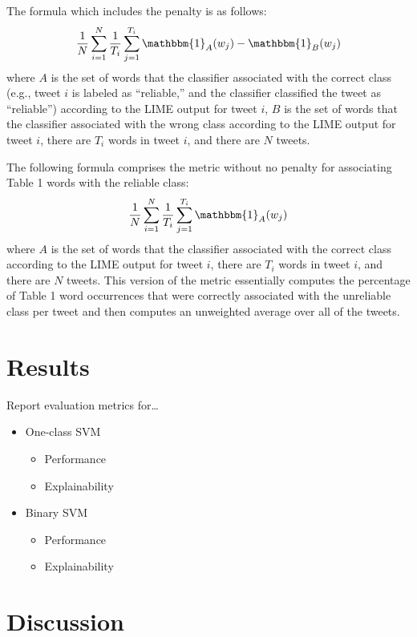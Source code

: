 \documentclass{article}
\begin{document}
The formula which includes the penalty is as follows:
\[\frac{1}{N} \sum_{i=1}^{N} \frac{1}{T_i} \sum_{j=1}^{T_i} \mathbbm{1}_A(w_j) - \mathbbm{1}_B(w_j)\]
where \(A\) is the set of words that the classifier associated with the
correct class (e.g., tweet \(i\) is labeled as ``reliable,'' and the
classifier classified the tweet as ``reliable'') according to the LIME
output for tweet \(i\), \(B\) is the set of words that the classifier
associated with the wrong class according to the LIME output for tweet
\(i\), there are \(T_i\) words in tweet \(i\), and there are \(N\)
tweets.

The following formula comprises the metric without no penalty for
associating Table 1 words with the reliable class:
\[\frac{1}{N} \sum_{i=1}^{N} \frac{1}{T_i} \sum_{j=1}^{T_i} \mathbbm{1}_A(w_j)\]
where \(A\) is the set of words that the classifier associated with the
correct class according to the LIME output for tweet \(i\), there are
\(T_i\) words in tweet \(i\), and there are \(N\) tweets. This version
of the metric essentially computes the percentage of Table 1 word
occurrences that were correctly associated with the unreliable class per
tweet and then computes an unweighted average over all of the tweets.

\hypertarget{results}{%
\section{Results}\label{results}}

\label{sec:results} Report evaluation metrics for\ldots{}

\begin{itemize}
\tightlist
\item
  One-class SVM

  \begin{itemize}
  \tightlist
  \item
    Performance
  \item
    Explainability
  \end{itemize}
\item
  Binary SVM

  \begin{itemize}
  \tightlist
  \item
    Performance
  \item
    Explainability
  \end{itemize}
\end{itemize}

\hypertarget{discussion}{%
\section{Discussion}\label{discussion}}
\end{document}
